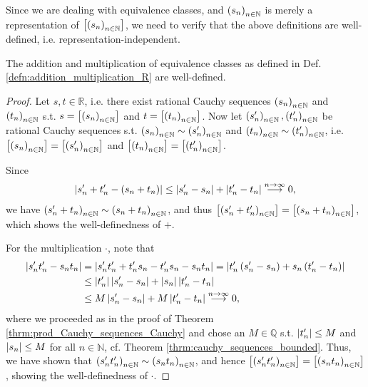 \begin{remark}
	Since we are dealing with equivalence classes, and $\seq[s_n]$ is merely a representation of $\left[\seq[s_n]\right]$, we need to verify that the above definitions are well-defined, i.e. representation-independent.
\end{remark}

\begin{theorem}
	The addition and multiplication of equivalence classes as defined in Def. \ref{defn:addition_multiplication_R} are well-defined.
\end{theorem}

\begin{proof}
	Let $s, t\in\mathbb R$, i.e. there exist rational Cauchy sequences $\seq[s_n]$ and $\seq[t_n]$ s.t. $s = \left[\seq[s_n]\right]$ and $t = \left[\seq[t_n]\right]$. Now let $\seq[s_n'], \seq[t_n']$ be rational Cauchy sequences s.t. $\seq[s_n]\sim \seq[s_n']$ and $\seq[t_n]\sim \seq[t_n']$, i.e. $\left[\seq[s_n]\right] = \left[\seq[s_n']\right]$ and  $\left[\seq[t_n]\right] = \left[\seq[t_n']\right]$. 
	
	Since 
	\begin{align*}
		\abs{s_n' + t_n' - (s_n + t_n)} \leq \abs{s_n' - s_n} + \abs{t_n' - t_n} \overset{n\to\infty}{\longrightarrow} 0,
	\end{align*}
	we have $\seq[s_n' + t_n] \sim \seq[s_n + t_n]$, and thus $\left[\seq[s_n' + t_n']\right] = \left[\seq[s_n + t_n]\right]$, which shows the well-definedness of $+$.
	
	For the multiplication $\cdot$, note that
	\begin{align*}
		\abs{s_n't_n' - s_nt_n} &= \abs{s_n't_n' + t_n's_n - t_n's_n - s_nt_n} = \abs{t_n'\left(s_n' - s_n\right) + s_n\left(t_n' - t_n\right)}
		\\ &\leq \abs{t_n'}\abs{s_n'-s_n} + \abs{s_n}\abs{t_n' - t_n}
		\\ &\leq M\abs{s_n'-s_n} + M\abs{t_n' - t_n} \overset{n\to\infty}{\longrightarrow} 0,
	\end{align*}
	where we proceeded as in the proof of Theorem \ref{thrm:prod_Cauchy_sequences_Cauchy} and chose an $M\in\mathbb Q$ s.t. $\abs{t_n'}\leq M$ and $\abs{s_n}\leq M$ for all $n\in\mathbb N$, cf. Theorem \ref{thrm:cauchy_sequences_bounded}. Thus, we have shown that $\seq[s_n't_n'] \sim \seq[s_nt_n]$, and hence $\left[\seq[s_n't_n']\right] = \left[\seq[s_nt_n]\right]$, showing the well-definedness of $\cdot$.
\end{proof}

